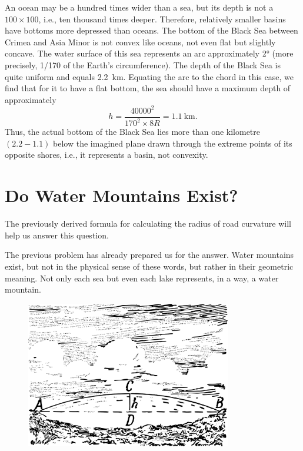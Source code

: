 An ocean may be a hundred times wider than a sea, but its depth is not a $100 \times 100$, i.e., ten thousand times deeper. Therefore, relatively smaller basins have bottoms more depressed than oceans. The bottom of the Black Sea between Crimea and Asia Minor is not convex like oceans, not even flat but slightly concave. The water surface of this sea represents an arc approximately \ang{2} (more precisely, 1/170 of the Earth's circumference). The depth of the Black Sea is quite uniform and equals \SI{2.2}{\kilo\meter}. Equating the arc to the chord in this case, we find that for it to have a flat bottom, the sea should have a maximum depth of approximately 
\begin{equation*}%
h = \frac{40000^{2}}{ 170^{2} \times 8R} = \SI{1.1}{\kilo\meter}.
\end{equation*}
Thus, the actual bottom of the Black Sea lies more than one kilometre $(2.2 - 1.1)$ below the imagined plane drawn through the extreme points of its opposite shores, i.e., it represents a basin, not convexity.

\clearpage

\section{Do Water Mountains Exist?}
\label{sec-4.9}


The previously derived formula for calculating the radius of road curvature will help us answer this question.

The previous problem has already prepared us for the answer. Water mountains exist, but not in the physical sense of these words, but rather in their geometric meaning. Not only each sea but even each lake represents, in a way, a water mountain. 

\begin{figure}[h!]
\centering
\includegraphics[width=0.8\textwidth]{figures/ch-04/fig-087.pdf}
\end{figure}


